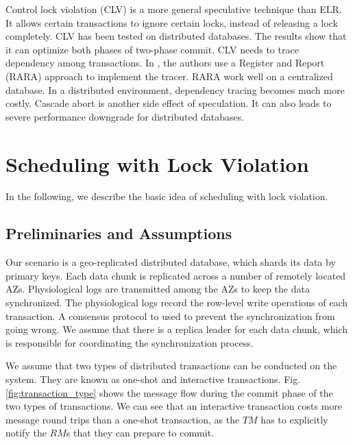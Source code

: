 \documentclass[conference]{IEEEtran}
\begin{document}
Control lock violation (CLV) \cite{CLV:conf/sigmod/GraefeLKTV13} is a more general speculative technique than ELR.
It allows certain transactions to ignore certain locks, instead of releasing a lock completely.
CLV has been tested on distributed databases. The results show that it can optimize both phases of two-phase commit.
CLV needs to trace dependency among transactions.
In \cite{CLV:conf/sigmod/GraefeLKTV13}, the authors use a Register and Report (RARA) approach \cite{HeckatonMVCC:journals/pvldb/LarsonBDFPZ11} to implement the tracer.
RARA work well on a centralized database. In a distributed environment, dependency tracing becomes much more costly.
Cascade abort is another side effect of speculation. It can also leads to severe performance downgrade for distributed databases.


\section{Scheduling with Lock Violation}
\label{sec:non_strict}

In the following, we describe the basic idea of scheduling with lock violation.

\subsection{Preliminaries and Assumptions}
Our scenario is a geo-replicated distributed database, which shards its data by primary keys.
Each data chunk is replicated across a number of remotely located AZs.
Physiological logs are transmitted among the AZs to keep the data synchronized.
The physiological logs record the row-level write operations of each transaction.
A consensus protocol to used to prevent the synchronization from going wrong.
We assume that there is a replica leader for each data chunk, which is responsible for coordinating the synchronization process.

We assume that two types of distributed transactions can be conducted on the system. They are known as one-shot and interactive transactions.
Fig.    \ref{fig:transaction_type} shows the message flow during the commit phase of the two types of transactions.
We can see that an interactive transaction costs more message round trips than a one-shot transaction,
as the $TM$ has to explicitly notify the $RM$s that they can prepare to commit.
\end{document}
